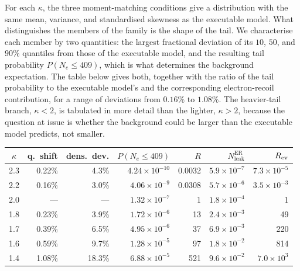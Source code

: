 \documentclass[11pt,a4paper]{article}
\begin{document}
For each \(\kappa\), the three moment-matching conditions give a
distribution with the same mean, variance, and standardised skewness as
the executable model. What distinguishes the members of the family is
the shape of the tail. We characterise each member by two quantities:
the largest fractional deviation of its \(10\), \(50\), and \(90\%\)
quantiles from those of the executable model, and the resulting tail
probability \(P(N_e\le409)\), which is what determines the background
expectation. The table below gives both, together with the ratio of the
tail probability to the executable model's and the corresponding
electron-recoil contribution, for a range of deviations from \(0.16\%\)
to \(1.08\%\). The heavier-tail branch, \(\kappa<2\), is tabulated in
more detail than the lighter, \(\kappa>2\), because the question at
issue is whether the background could be larger than the executable
model predicts, not smaller. 
\begin{center} 
\begin{tabular}{crrrrrr}
\toprule 
\(\kappa\) & q.\ shift & dens.\ dev. & \(P(N_e\le409)\) & \(R\) & \(N^\mathrm{ER}_\mathrm{leak}\) & \(R_{\rm ev}\)\\ 
\midrule 
2.3 & 0.22\% & 4.3\%  & \(4.24\times10^{-10}\) & 0.0032 & \(5.9\times10^{-7}\) & \(7.3\times10^{-5}\)\\ 
2.2 & 0.16\% & 3.0\%  & \(4.06\times10^{-9}\) & 0.0308 & \(5.7\times10^{-6}\) & \(3.5\times10^{-3}\)\\ 
2.0 & ---    & ---    & \(1.32\times10^{-7}\) & 1 & \(1.8\times10^{-4}\) & 1\\ 
1.8 & 0.23\% & 3.9\%  & \(1.72\times10^{-6}\) & 13 & \(2.4\times10^{-3}\) & 49\\ 
1.7 & 0.39\% & 6.5\%  & \(4.95\times10^{-6}\) & 37 & \(6.9\times10^{-3}\) & 220\\ 
1.6 & 0.59\% & 9.7\%  & \(1.28\times10^{-5}\) & 97 & \(1.8\times10^{-2}\) & 814\\ 
1.4 & 1.08\% & 18.3\% & \(6.88\times10^{-5}\) & 521 & \(9.6\times10^{-2}\) & \(7.0\times10^{3}\)\\ 
\bottomrule 
\end{tabular} 
\end{center}
\end{document}
